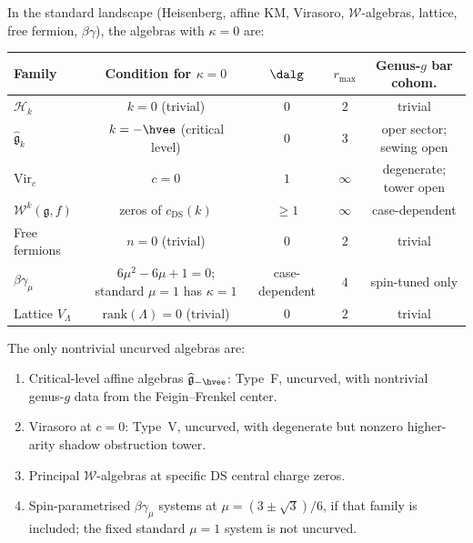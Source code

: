 \documentclass[11pt]{article}
\newcommand{\cW}{\mathcal{W}}
\newcommand{\cH}{\mathcal{H}}
\newcommand{\fg}{\mathfrak{g}}
\begin{document}
\begin{proposition}
\label{prop:uncurved-locus-complete}
In the standard landscape (Heisenberg, affine KM, Virasoro,
$\cW$-algebras, lattice, free fermion, $\beta\gamma$), the
algebras with $\kappa = 0$ are:
\begin{center}
\renewcommand{\arraystretch}{1.3}
\begin{tabular}{lcccc}
\textbf{Family} & \textbf{Condition for $\kappa = 0$}
  & $\boldsymbol{\dalg}$ & \textbf{$r_{\max}$}
  & \textbf{Genus-$g$ bar cohom.} \\
\hline
$\cH_k$ & $k = 0$ (trivial) & $0$ & $2$
  & trivial \\
$\widehat{\fg}_k$ & $k = -\hvee$ (critical level)
  & $0$ & $3$
  & oper sector; sewing open \\
$\mathrm{Vir}_c$ & $c = 0$ & $1$ & $\infty$
  & degenerate; tower open \\
$\cW^k(\fg, f)$ & zeros of $c_{\mathrm{DS}}(k)$
  & $\geq 1$ & $\infty$
  & case-dependent \\
Free fermions & $n = 0$ (trivial) & $0$ & $2$
  & trivial \\
$\beta\gamma_\mu$ & $6\mu^2-6\mu+1=0$; standard $\mu=1$ has
  $\kappa=1$ & case-dependent & $4$
  & spin-tuned only \\
Lattice $V_\Lambda$ & $\mathrm{rank}(\Lambda) = 0$ (trivial)
  & $0$ & $2$
  & trivial
\end{tabular}
\end{center}
The only nontrivial uncurved algebras are:
\begin{enumerate}[label=\textup{(\roman*)}]
\item Critical-level affine algebras
  $\widehat{\fg}_{-\hvee}$: Type~F, uncurved, with
  nontrivial genus-$g$ data from the Feigin--Frenkel center.
\item Virasoro at $c = 0$: Type~V, uncurved, with degenerate
  but nonzero higher-arity shadow obstruction tower.
\item Principal $\cW$-algebras at specific DS central charge zeros.
\item Spin-parametrised $\beta\gamma_\mu$ systems at
  $\mu=(3\pm\sqrt3)/6$, if that family is included; the fixed
  standard $\mu=1$ system is not uncurved.
\end{enumerate}
\end{proposition}
\end{document}

